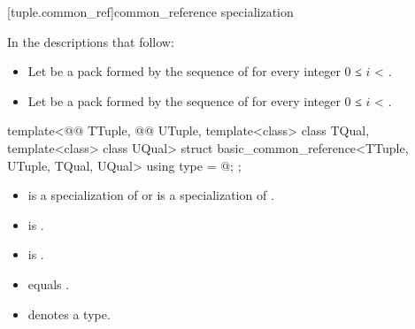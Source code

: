 \documentclass{wg21}
\begin{document}
\begin{addedblock}
[tuple.common_ref]{common_reference specialization}

\begin{addedblock}
    In the descriptions that follow:
    \begin{itemize}
        \item Let  be a pack formed by the sequence of  for every integer $0$ ≤ $i$ < .
        \item Let  be a pack formed by the sequence of  for every integer $0$ ≤ $i$ < .
    \end{itemize}



\end{addedblock}

\begin{itemdecl}
template<@@ TTuple, @@ UTuple, template<class> class TQual, template<class> class UQual>
struct basic_common_reference<TTuple, UTuple, TQual, UQual> {
    using type = @\seebelow@;
};
\end{itemdecl}

\begin{itemdescr}
\constraints
\begin{itemize}
    \item {} is a specialization of  or  is a specialization of .
    \item {} is .
    \item {} is .
    \item {} equals .
    \item {} denotes a type.
\end{itemize}


\end{itemdescr}
\end{addedblock}
\end{document}
